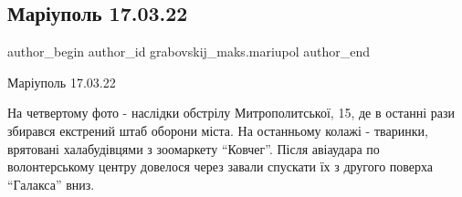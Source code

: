  
 
 
 
 

\subsection{Маріуполь 17.03.22}
\label{sec:17_03_2023.fb.grabovskij_maks.mariupol.1.mar_upol_17_03_22}

\ifcmt
 author_begin
   author_id grabovskij_maks.mariupol
 author_end
\fi

Маріуполь 17.03.22

На четвертому фото - наслідки обстрілу Митрополитської, 15, де в останні рази
збирався екстрений штаб оборони міста. На останньому колажі - тваринки,
врятовані халабудівцями з зоомаркету \enquote{Ковчег}. Після авіаудара по
волонтерському центру довелося через завали спускати їх з другого поверха
\enquote{Галакса} вниз.

